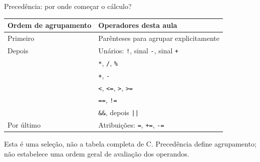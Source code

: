 \begin{frame}{Precedência: por onde começar o cálculo?}
\small
\begin{tabularx}{\textwidth}{lX}
\toprule
Ordem de agrupamento & Operadores desta aula \\
\midrule
Primeiro & Parênteses para agrupar explicitamente \\
Depois & Unários: \texttt{!}, sinal \texttt{-}, sinal \texttt{+} \\
 & \texttt{*}, \texttt{/}, \texttt{\%} \\
 & \texttt{+}, \texttt{-} \\
 & \texttt{<}, \texttt{<=}, \texttt{>}, \texttt{>=} \\
 & \texttt{==}, \texttt{!=} \\
 & \texttt{\&\&}, depois \texttt{||} \\
Por último & Atribuições: \texttt{=}, \texttt{+=}, \texttt{-=} \\
\bottomrule
\end{tabularx}
\medskip
Esta é uma seleção, não a tabela completa de C. Precedência define agrupamento; não estabelece uma ordem geral de avaliação dos operandos.
\end{frame}
